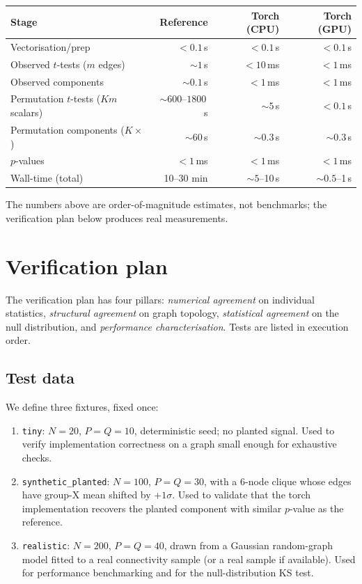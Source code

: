 \documentclass[11pt]{article}
\begin{document}
\begin{center}
\begin{tabular}{lrrr}
\toprule
Stage & Reference & Torch (CPU) & Torch (GPU) \\
\midrule
Vectorisation/prep                     & $<0.1$\,s   & $<0.1$\,s   & $<0.1$\,s \\
Observed $t$-tests ($m$ edges)          & $\sim 1$\,s & $<10$\,ms   & $<1$\,ms  \\
Observed components                     & $\sim 0.1$\,s & $<1$\,ms  & $<1$\,ms  \\
Permutation $t$-tests ($Km$ scalars)    & $\sim 600$--$1800$\,s & $\sim 5$\,s & $<0.1$\,s \\
Permutation components ($K\times$)      & $\sim 60$\,s & $\sim 0.3$\,s & $\sim 0.3$\,s \\
$p$-values                              & $<1$\,ms    & $<1$\,ms    & $<1$\,ms  \\
\midrule
Wall-time (total)                       & 10--30 min & $\sim 5$--10\,s & $\sim 0.5$--1\,s \\
\bottomrule
\end{tabular}
\end{center}

The numbers above are order-of-magnitude estimates, not benchmarks; the verification plan below produces real measurements.

\section{Verification plan}

The verification plan has four pillars: \emph{numerical agreement} on individual statistics, \emph{structural agreement} on graph topology, \emph{statistical agreement} on the null distribution, and \emph{performance characterisation}. Tests are listed in execution order.

\subsection{Test data}

We define three fixtures, fixed once:

\begin{enumerate}[leftmargin=2.0em]
\item \texttt{tiny}: $N=20$, $P=Q=10$, deterministic seed; no planted signal. Used to verify implementation correctness on a graph small enough for exhaustive checks.
\item \texttt{synthetic\_planted}: $N=100$, $P=Q=30$, with a 6-node clique whose edges have group-X mean shifted by $+1\sigma$. Used to validate that the torch implementation recovers the planted component with similar $p$-value as the reference.
\item \texttt{realistic}: $N=200$, $P=Q=40$, drawn from a Gaussian random-graph model fitted to a real connectivity sample (or a real sample if available). Used for performance benchmarking and for the null-distribution KS test.
\end{enumerate}
\end{document}
